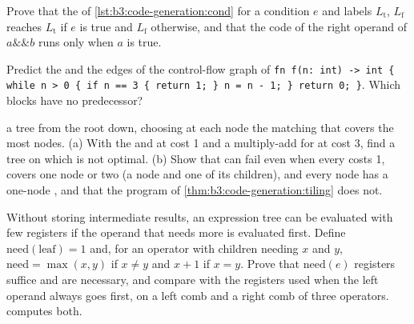\begin{exercise}[$\star\star$]\label{exo:b3:code-generation:8}
Prove that the  of \cref{lst:b3:code-generation:cond} for a condition $e$ and labels $L_{\mathrm{t}}$, $L_{\mathrm{f}}$ reaches $L_{\mathrm{t}}$ if $e$ is true and $L_{\mathrm{f}}$ otherwise, and that the code of the right operand of $a \mathbin{\&\&} b$ runs only when $a$ is true.
\end{exercise}

\begin{exercise}[$\star\star$]\label{exo:b3:code-generation:9}
Predict the  and the edges of the control-flow graph of \texttt{fn f(n:\ int) -> int \{ while n > 0 \{ if n == 3 \{ return 1; \} n = n - 1; \} return 0; \}}. Which blocks have no predecessor?
\end{exercise}

\begin{exercise}[$\star\star\star$]\label{exo:b3:code-generation:10}
\emph{}  a tree from the root down, choosing at each node the matching  that covers the most nodes. (a) With the   and  at cost 1 and a multiply-add  for  at cost 3, find a tree on which  is not optimal. (b) Show that  can fail even when every  costs 1, covers one node or two (a node and one of its children), and every node has a one-node , and that the program of \cref{thm:b3:code-generation:tiling} does not.
\end{exercise}

\begin{exercise}[$\star\star\star$]\label{exo:b3:code-generation:11}
Without storing intermediate results, an expression tree can be evaluated with few registers if the operand that needs more is evaluated first. Define $\mathrm{need}(\text{leaf}) = 1$ and, for an operator with children needing $x$ and $y$, $\mathrm{need} = \max(x, y)$ if $x \ne y$ and $x + 1$ if $x = y$. Prove that $\mathrm{need}(e)$ registers suffice and are necessary, and compare with the registers used when the left operand always goes first, on a left comb and a right comb of three operators.  computes both.
\end{exercise}

